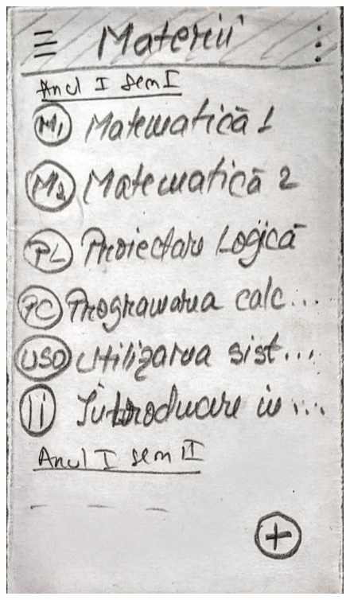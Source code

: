 \begin{figure}[ht]
         \includegraphics[height=0.279\textheight]{figures/app/paper/classes.jpg}

\end{figure}
